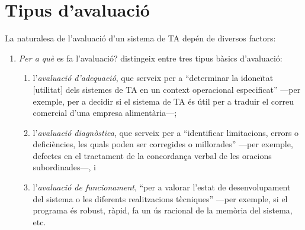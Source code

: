 \section{Tipus d'avaluació}
\label{ss:tipusaval}
La naturalesa de l'avaluació d'un sistema de TA
depén de diversos factors:
\begin{enumerate}
\item \emph{Per a què} es fa l'avaluació? \citet{hutchins96u} distingeix
  entre tres tipus bàsics d'avaluació: 
\begin{enumerate}
\item l'\emph{avaluació d'adequació}, que serveix per a ``determinar
  la idoneïtat [utilitat] dels sistemes de TA en un context
  operacional especificat'' ---per exemple, per a decidir si el
  sistema de TA és útil per a traduir el correu comercial d'una
  empresa alimentària---;
\item l'{\em avaluació diagnòstica}, que serveix per a ``identificar
  limitacions, errors o deficiències, les quals poden ser corregides o
  millorades'' ---per exemple, defectes en el tractament de la
  concordança verbal de les oracions subordinades---, i
\item l'\emph{avaluació de funcionament},  ``per a valorar l'estat de
  desenvolupament del sistema o les diferents realitzacions
  tècniques'' ---per exemple, si el programa és robust,
  ràpid, fa un ús racional de la memòria del sistema, etc.
\end{enumerate}


\end{enumerate}
